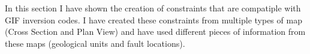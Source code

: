 In this section I have shown the creation of constraints that are compatiple with \ac{GIF} inversion codes. I have created these constraints from multiple types of map (Cross Section and Plan View) and have used different pieces of information from these maps (geological units and fault locations).



%

\endinput

Any text after an \endinput is ignored.
You could put scraps here or things in progress.
